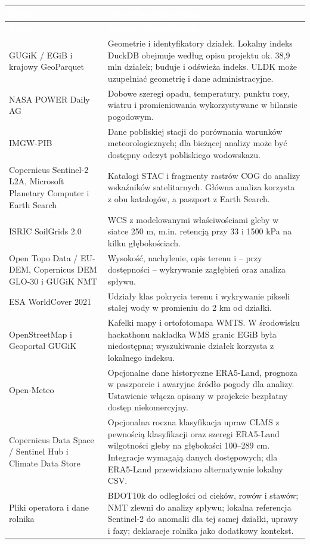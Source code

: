 \documentclass[11pt,a4paper]{article}
\newcommand{\code}[1]{\textcolor{PWField}{\texttt{\detokenize{#1}}}}
\begin{document}
\begin{longtable}{@{}p{}p{}@{}}
\toprule
\rowcolor{PWForest}\textcolor{white}{\textbf{Źródło}} & \textcolor{white}{\textbf{Zakres wykorzystania}} \\
\midrule
\endfirsthead
\toprule
\rowcolor{PWForest}\textcolor{white}{\textbf{Źródło}} & \textcolor{white}{\textbf{Zakres wykorzystania}} \\
\midrule
\endhead
GUGiK / EGiB i krajowy GeoParquet & Geometrie i identyfikatory działek. Lokalny indeks DuckDB obejmuje według opisu projektu ok. 38,9 mln działek; \code{parcels-updater} buduje i odświeża indeks. ULDK może uzupełniać geometrię i dane administracyjne. \\
NASA POWER Daily AG & Dobowe szeregi opadu, temperatury, punktu rosy, wiatru i promieniowania wykorzystywane w bilansie pogodowym. \\
IMGW-PIB & Dane pobliskiej stacji do porównania warunków meteorologicznych; dla bieżącej analizy może być dostępny odczyt pobliskiego wodowskazu. \\
Copernicus Sentinel-2 L2A, Microsoft Planetary Computer i Earth Search & Katalogi STAC i fragmenty rastrów COG do analizy wskaźników satelitarnych. Główna analiza korzysta z obu katalogów, a paszport z Earth Search. \\
ISRIC SoilGrids 2.0 & WCS z modelowanymi właściwościami gleby w siatce 250 m, m.in. retencją przy 33 i 1500 kPa na kilku głębokościach. \\
Open Topo Data / EU-DEM, Copernicus DEM GLO-30 i GUGiK NMT & Wysokość, nachylenie, opis terenu i -- przy dostępności -- wykrywanie zagłębień oraz analiza spływu. \\
ESA WorldCover 2021 & Udziały klas pokrycia terenu i wykrywanie pikseli stałej wody w promieniu do 2 km od działki. \\
OpenStreetMap i Geoportal GUGiK & Kafelki mapy i ortofotomapa WMTS. W środowisku hackathonu nakładka WMS granic EGiB była niedostępna; wyszukiwanie działek korzysta z lokalnego indeksu. \\
Open-Meteo & Opcjonalne dane historyczne ERA5-Land, prognoza w paszporcie i awaryjne źródło pogody dla analizy. Ustawienie \code{WODO_NONCOMMERCIAL_OPEN_METEO=1} włącza opisany w projekcie bezpłatny dostęp niekomercyjny. \\
Copernicus Data Space / Sentinel Hub i Climate Data Store & Opcjonalna roczna klasyfikacja upraw CLMS z pewnością klasyfikacji oraz szeregi ERA5-Land wilgotności gleby na głębokości 100--289 cm. Integracje wymagają danych dostępowych; dla ERA5-Land przewidziano alternatywnie lokalny CSV. \\
Pliki operatora i dane rolnika & BDOT10k do odległości od cieków, rowów i stawów; NMT zlewni do analizy spływu; lokalna referencja Sentinel-2 do anomalii dla tej samej działki, uprawy i fazy; deklaracje rolnika jako dodatkowy kontekst. \\
\bottomrule
\end{longtable}
\end{document}
